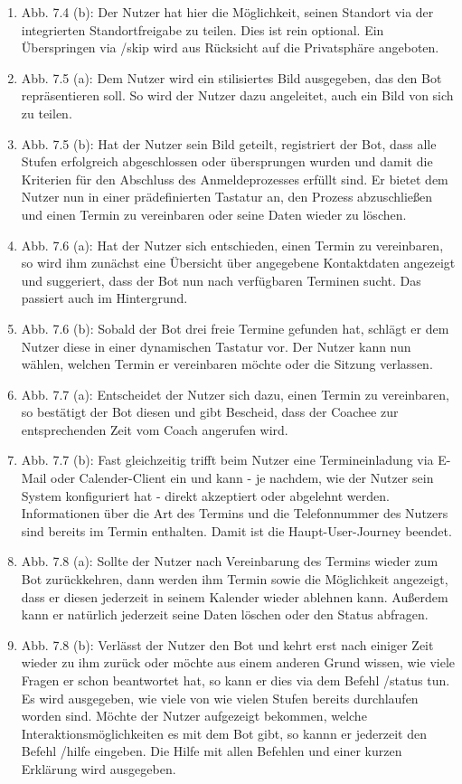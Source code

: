 \begin{enumerate}
		\item Abb. 7.4 (b): Der Nutzer hat hier die Möglichkeit, seinen Standort via der integrierten Standortfreigabe zu teilen. Dies ist rein optional. Ein Überspringen via /skip wird aus Rücksicht auf die Privatsphäre angeboten. 
		\item Abb. 7.5 (a): Dem Nutzer wird ein stilisiertes Bild ausgegeben, das den Bot repräsentieren soll. So wird der Nutzer dazu angeleitet, auch ein Bild von sich zu teilen.
		\item Abb. 7.5 (b): Hat der Nutzer sein Bild geteilt, registriert der Bot, dass alle Stufen erfolgreich abgeschlossen oder übersprungen wurden und damit die Kriterien für den Abschluss des Anmeldeprozesses erfüllt sind. Er bietet dem Nutzer nun in einer prädefinierten Tastatur an, den Prozess abzuschließen und einen Termin zu vereinbaren oder seine Daten wieder zu löschen.
		\item Abb. 7.6 (a): Hat der Nutzer sich entschieden, einen Termin zu vereinbaren, so wird ihm zunächst eine Übersicht über angegebene Kontaktdaten angezeigt und suggeriert, dass der Bot nun nach verfügbaren Terminen sucht. Das passiert auch im Hintergrund.
		\item Abb. 7.6 (b): Sobald der Bot drei freie Termine gefunden hat, schlägt er dem Nutzer diese in einer dynamischen Tastatur vor. Der Nutzer kann nun wählen, welchen Termin er vereinbaren möchte oder die Sitzung verlassen.
		\item Abb. 7.7 (a): Entscheidet der Nutzer sich dazu, einen Termin zu vereinbaren, so bestätigt der Bot diesen und gibt Bescheid, dass der Coachee zur entsprechenden Zeit vom Coach angerufen wird. 
		\item Abb. 7.7 (b): Fast gleichzeitig trifft beim Nutzer eine Termineinladung via E-Mail oder Calender-Client ein und kann - je nachdem, wie der Nutzer sein System konfiguriert hat - direkt akzeptiert oder abgelehnt werden. Informationen über die Art des Termins und die Telefonnummer des Nutzers sind bereits im Termin enthalten. Damit ist die Haupt-User-Journey beendet.
		\item Abb. 7.8 (a): Sollte der Nutzer nach Vereinbarung des Termins wieder zum Bot zurückkehren, dann werden ihm Termin sowie die Möglichkeit angezeigt, dass er diesen jederzeit in seinem Kalender wieder ablehnen kann. Außerdem kann er natürlich jederzeit seine Daten löschen oder den Status abfragen.
		\item Abb. 7.8 (b): Verlässt der Nutzer den Bot und kehrt erst nach einiger Zeit wieder zu ihm zurück oder möchte aus einem anderen Grund wissen, wie viele Fragen er schon beantwortet hat, so kann er dies via dem Befehl /status tun. Es wird ausgegeben, wie viele von wie vielen Stufen bereits durchlaufen worden sind. Möchte der Nutzer aufgezeigt bekommen, welche Interaktionsmöglichkeiten es mit dem Bot gibt, so kannn er jederzeit den Befehl /hilfe eingeben. Die Hilfe mit allen Befehlen und einer kurzen Erklärung wird ausgegeben.

\end{enumerate}
